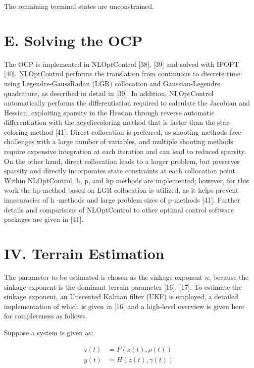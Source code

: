 \documentclass[10pt]{article}
\begin{document}
The remaining terminal states are unconstrained.

\section*{E. Solving the OCP}
The OCP is implemented in NLOptControl [38], [39] and solved with IPOPT [40]. NLOptControl performs the translation from continuous to discrete time using Legendre-GaussRadau (LGR) collocation and Gaussian-Legendre quadrature, as described in detail in [39]. In addition, NLOptControl automatically performs the differentiation required to calculate the Jacobian and Hessian, exploiting sparsity in the Hessian through reverse automatic differentiation with the acycliccoloring method that is faster than the star-coloring method [41]. Direct collocation is preferred, as shooting methods face challenges with a large number of variables, and multiple shooting methods require expensive integration at each iteration and can lead to reduced sparsity. On the other hand, direct collocation leads to a larger problem, but preserves sparsity and directly incorporates state constraints at each collocation point. Within NLOptControl, h, p, and hp methods are implemented; however, for this work the hp-method based on LGR collocation is utilized, as it helps prevent inaccuracies of h -methods and large problem sizes of p-methods [41]. Further details and comparisons of NLOptControl to other optimal control software packages are given in [41].

\section*{IV. Terrain Estimation}
The parameter to be estimated is chosen as the sinkage exponent $n$, because the sinkage exponent is the dominant terrain parameter [16], [17]. To estimate the sinkage exponent, an Unscented Kalman filter (UKF) is employed, a detailed implementation of which is given in [16] and a high-level overview is given here for completeness as follows.

Suppose a system is given as:


\begin{align*}
\dot{z}(t) & =F(z(t), \rho(t))  \tag{18}\\
y(t) & =H(z(t), \gamma(t)) \tag{19}
\end{align*}
\end{document}
